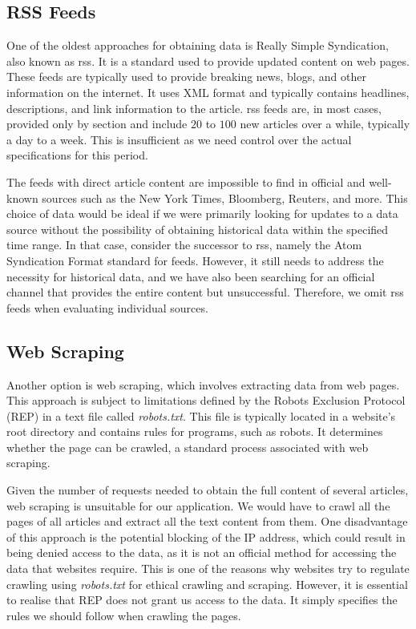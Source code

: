 \subsection{RSS Feeds}
\label{sec:textual-data-rss-feeds}
One of the oldest approaches for obtaining data is Really Simple Syndication, also known as \acrshort{rss}. It is a standard used to provide updated content on web pages. These feeds are typically used to provide breaking news, blogs, and other information on the internet. It uses XML format and typically contains headlines, descriptions, and link information to the article. \acrshort{rss} feeds are, in most cases, provided only by section and include $20$ to $100$ new articles over a while, typically a day to a week. This is insufficient as we need control over the actual specifications for this period. 

The feeds with direct article content are impossible to find in official and well-known sources such as the New York Times, Bloomberg, Reuters, and more. This choice of data would be ideal if we were primarily looking for updates to a data source without the possibility of obtaining historical data within the specified time range. In that case, consider the successor to \acrshort{rss}, namely the Atom Syndication Format \parencite{atom-wiki} standard for feeds. However, it still needs to address the necessity for historical data, and we have also been searching for an official channel that provides the entire content but unsuccessful. Therefore, we omit \acrshort{rss} feeds when evaluating individual sources.

\subsection{Web Scraping}
\label{sec:textual-data-web-scraping}
Another option is web scraping, which involves extracting data from web pages. This approach is subject to limitations defined by the Robots Exclusion Protocol (REP) in a text file called \textit{robots.txt}. This file is typically located in a website's root directory and contains rules for programs, such as robots. It determines whether the page can be crawled, a standard process associated with web scraping. 

Given the number of requests needed to obtain the full content of several articles, web scraping is unsuitable for our application. We would have to crawl all the pages of all articles and extract all the text content from them. One disadvantage of this approach is the potential blocking of the IP address, which could result in being denied access to the data, as it is not an official method for accessing the data that websites require. This is one of the reasons why websites try to regulate crawling using \textit{robots.txt} for ethical crawling and scraping. However, it is essential to realise that REP does not grant us access to the data. It simply specifies the rules we should follow when crawling the pages.

